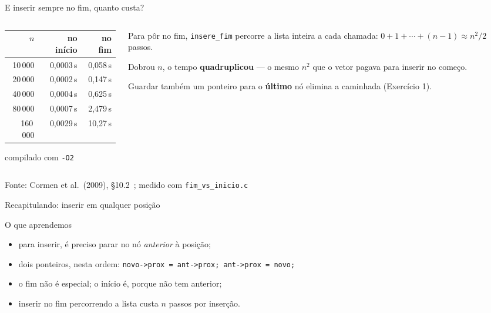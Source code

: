 \documentclass[aspectratio=169]{beamer}
\newcommand{\fonte}[1]{\vfill\hfill{\scriptsize\textcolor{UFSGray}{Fonte: #1}}}
\begin{document}
\begin{frame}{E inserir sempre no fim, quanto custa?}
  \begin{columns}[c]
    \begin{column}{0.52\textwidth}
      \begin{center}
      \small
      \begin{tabular}{@{}rrr@{}}
        \toprule
        $n$ & no início & no fim\\
        \midrule
        10\,000  & 0,0003\,s & 0,058\,s\\
        20\,000  & 0,0002\,s & 0,147\,s\\
        40\,000  & 0,0004\,s & 0,625\,s\\
        80\,000  & 0,0007\,s & 2,479\,s\\
        160\,000 & 0,0029\,s & 10,27\,s\\
        \bottomrule
      \end{tabular}

      \medskip
      \scriptsize compilado com \texttt{-O2}
      \end{center}
    \end{column}
    \begin{column}{0.44\textwidth}
      \small
      Para pôr no fim, \texttt{insere\_fim} percorre a lista inteira a
      cada chamada: $0 + 1 + \cdots + (n-1) \approx n^2/2$ passos.

      \medskip
      Dobrou $n$, o tempo \textbf{quadruplicou} --- o mesmo $n^2$ que o
      vetor pagava para inserir no começo.

      \medskip
      Guardar também um ponteiro para o \textbf{último} nó elimina a
      caminhada (Exercício 1).
    \end{column}
  \end{columns}
  \fonte{Cormen et al.\ (2009), §10.2~\cite{cormen2009introduction};
    medido com \texttt{fim\_vs\_inicio.c}}
\end{frame}

\begin{frame}{Recapitulando: inserir em qualquer posição}
  \begin{block}{O que aprendemos}
    \begin{itemize}
      \item para inserir, é preciso parar no nó \emph{anterior} à posição;
      \item dois ponteiros, nesta ordem: \texttt{novo->prox = ant->prox;
        ant->prox = novo;}
      \item o fim não é especial; o início é, porque não tem anterior;
      \item inserir no fim percorrendo a lista custa $n$ passos por
        inserção.
    \end{itemize}
  \end{block}
\end{frame}
\end{document}
